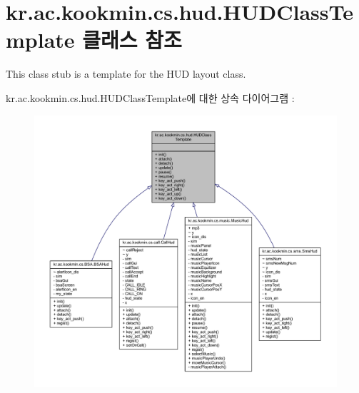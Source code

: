 \hypertarget{classkr_1_1ac_1_1kookmin_1_1cs_1_1hud_1_1_h_u_d_class_template}{}\section{kr.\+ac.\+kookmin.\+cs.\+hud.\+H\+U\+D\+Class\+Template 클래스 참조}
\label{classkr_1_1ac_1_1kookmin_1_1cs_1_1hud_1_1_h_u_d_class_template}


This class stub is a template for the H\+U\+D layout class.  




kr.\+ac.\+kookmin.\+cs.\+hud.\+H\+U\+D\+Class\+Template에 대한 상속 다이어그램 \+: \nopagebreak
\begin{figure}[H]
\begin{center}
\leavevmode
\includegraphics[width=350pt]{classkr_1_1ac_1_1kookmin_1_1cs_1_1hud_1_1_h_u_d_class_template__inherit__graph}
\end{center}
\end{figure}


